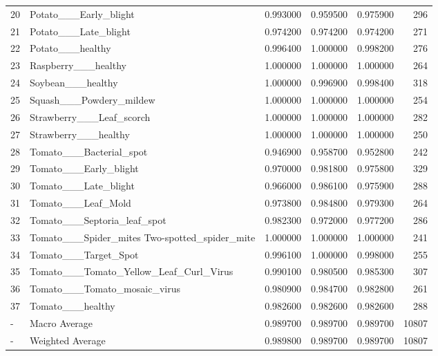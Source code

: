 \begin{table}
\begin{tabular}{llrrrr}
20 & Potato___Early_blight & 0.993000 & 0.959500 & 0.975900 & 296 \\
21 & Potato___Late_blight & 0.974200 & 0.974200 & 0.974200 & 271 \\
22 & Potato___healthy & 0.996400 & 1.000000 & 0.998200 & 276 \\
23 & Raspberry___healthy & 1.000000 & 1.000000 & 1.000000 & 264 \\
24 & Soybean___healthy & 1.000000 & 0.996900 & 0.998400 & 318 \\
25 & Squash___Powdery_mildew & 1.000000 & 1.000000 & 1.000000 & 254 \\
26 & Strawberry___Leaf_scorch & 1.000000 & 1.000000 & 1.000000 & 282 \\
27 & Strawberry___healthy & 1.000000 & 1.000000 & 1.000000 & 250 \\
28 & Tomato___Bacterial_spot & 0.946900 & 0.958700 & 0.952800 & 242 \\
29 & Tomato___Early_blight & 0.970000 & 0.981800 & 0.975800 & 329 \\
30 & Tomato___Late_blight & 0.966000 & 0.986100 & 0.975900 & 288 \\
31 & Tomato___Leaf_Mold & 0.973800 & 0.984800 & 0.979300 & 264 \\
32 & Tomato___Septoria_leaf_spot & 0.982300 & 0.972000 & 0.977200 & 286 \\
33 & Tomato___Spider_mites Two-spotted_spider_mite & 1.000000 & 1.000000 & 1.000000 & 241 \\
34 & Tomato___Target_Spot & 0.996100 & 1.000000 & 0.998000 & 255 \\
35 & Tomato___Tomato_Yellow_Leaf_Curl_Virus & 0.990100 & 0.980500 & 0.985300 & 307 \\
36 & Tomato___Tomato_mosaic_virus & 0.980900 & 0.984700 & 0.982800 & 261 \\
37 & Tomato___healthy & 0.982600 & 0.982600 & 0.982600 & 288 \\
- & Macro Average & 0.989700 & 0.989700 & 0.989700 & 10807 \\
- & Weighted Average & 0.989800 & 0.989700 & 0.989700 & 10807 \\
\bottomrule
\end{tabular}
\end{table}
